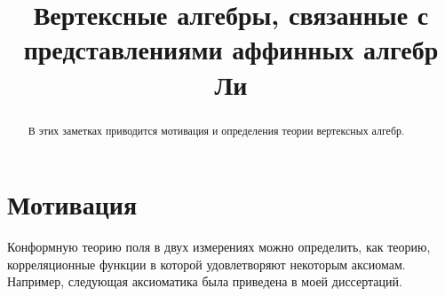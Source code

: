 \documentclass[12pt]{article}
\begin{document}
\title{Вертексные алгебры, связанные с представлениями аффинных алгебр Ли}

\maketitle

\begin{abstract}
  В этих заметках приводится мотивация и определения теории вертексных алгебр.
\end{abstract}

\section{Мотивация}

Конформную теорию поля в двух измерениях можно определить, как теорию, корреляционные функции в
которой удовлетворяют некоторым аксиомам. Например, следующая аксиоматика была приведена в моей
диссертаций. 
\end{document}

